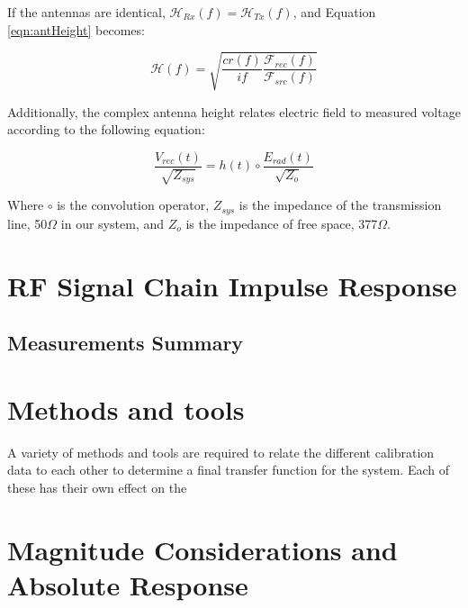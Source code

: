 If the antennas are identical, $\mathcal{H}_{Rx}(f) = \mathcal{H}_{Tx}(f)$, and Equation \ref{eqn:antHeight} becomes:

\begin{equation}
\mathcal{H}(f) = \sqrt{ \frac{c r(f)}{if} \frac{\mathcal{F}_{rec}(f)}{\mathcal{F}_{src}(f)} }
\label{eqn:antHeight2}
\end{equation}

Additionally, the complex antenna height relates electric field to measured voltage according to the following equation:

\begin{equation}
\frac{V_{rec}(t)}{\sqrt{Z_{sys}}} = h(t) \circ \frac{ E_{rad}(t) }{ \sqrt{Z_{o}} }
\label{eqn:antHeight2EField}
\end{equation}

Where $\circ$ is the convolution operator, $Z_{sys}$ is the impedance of the transmission line, 50$\Omega$ in our system, and $Z_{o}$ is the impedance of free space, 377$\Omega$.

\section{RF Signal Chain Impulse Response}
		
	\subsection{Measurements Summary}

		
		

\section{Methods and tools}
	
	A variety of methods and tools are required to relate the different calibration data to each other to determine a final transfer function for the system.  Each of these has their own effect on the 

\section{Magnitude Considerations and Absolute Response}
	
